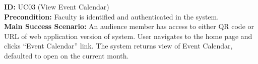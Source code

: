 \textbf{ID:} UC03 (View Event Calendar) \\
\textbf{Precondition:} Faculty is identified and authenticated in the system. \\
\textbf{Main Success Scenario:} An audience member has access to either QR code or URL of web application version of system. User navigates to the home page and clicks ``Event Calendar'' link. The system returns view of Event Calendar, defaulted to open on the current month. \\